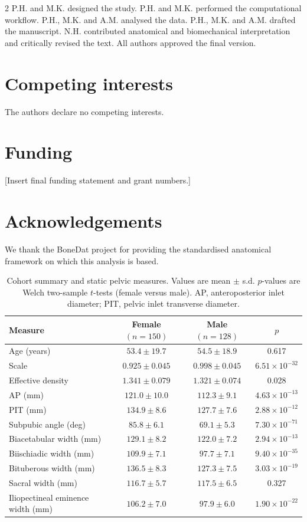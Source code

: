\documentclass[openacc]{rsproca_new}
\begin{document}
\begin{multicols}{2}
P.H. and M.K. designed the study. P.H. and M.K. performed the computational workflow. P.H., M.K. and A.M. analysed the data. P.H., M.K. and A.M. drafted the manuscript. N.H. contributed anatomical and biomechanical interpretation and critically revised the text. All authors approved the final version.

\section*{Competing interests}

The authors declare no competing interests.

\section*{Funding}

[Insert final funding statement and grant numbers.]

\section*{Acknowledgements}

We thank the BoneDat project for providing the standardised anatomical framework on which this analysis is based.

\end{multicols}
\begin{table}[p]
\centering
\caption{Cohort summary and static pelvic measures. Values are mean $\pm$ s.d. $p$-values are Welch two-sample $t$-tests (female versus male). AP, anteroposterior inlet diameter; PIT, pelvic inlet transverse diameter.}
\label{tab:cohort}
\begin{tabular}{lccc}
\toprule
Measure & Female $(n=150)$ & Male $(n=128)$ & $p$ \\
\midrule
Age (years) & $53.4 \pm 19.7$ & $54.5 \pm 18.9$ & 0.617 \\
Scale & $0.925 \pm 0.045$ & $0.998 \pm 0.045$ & $6.51 \times 10^{-32}$ \\
Effective density & $1.341 \pm 0.079$ & $1.321 \pm 0.074$ & 0.028 \\
AP (mm) & $121.0 \pm 10.0$ & $112.3 \pm 9.1$ & $4.63 \times 10^{-13}$ \\
PIT (mm) & $134.9 \pm 8.6$ & $127.7 \pm 7.6$ & $2.88 \times 10^{-12}$ \\
Subpubic angle (deg) & $85.8 \pm 6.1$ & $69.1 \pm 5.3$ & $7.30 \times 10^{-71}$ \\
Biacetabular width (mm) & $129.1 \pm 8.2$ & $122.0 \pm 7.2$ & $2.94 \times 10^{-13}$ \\
Biischiadic width (mm) & $109.9 \pm 7.1$ & $97.7 \pm 7.1$ & $9.40 \times 10^{-35}$ \\
Bituberous width (mm) & $136.5 \pm 8.3$ & $127.3 \pm 7.5$ & $3.03 \times 10^{-19}$ \\
Sacral width (mm) & $116.7 \pm 5.7$ & $117.5 \pm 6.5$ & 0.327 \\
Iliopectineal eminence width (mm) & $106.2 \pm 7.0$ & $97.9 \pm 6.0$ & $1.90 \times 10^{-22}$ \\
\bottomrule
\end{tabular}
\end{table}
\end{document}
